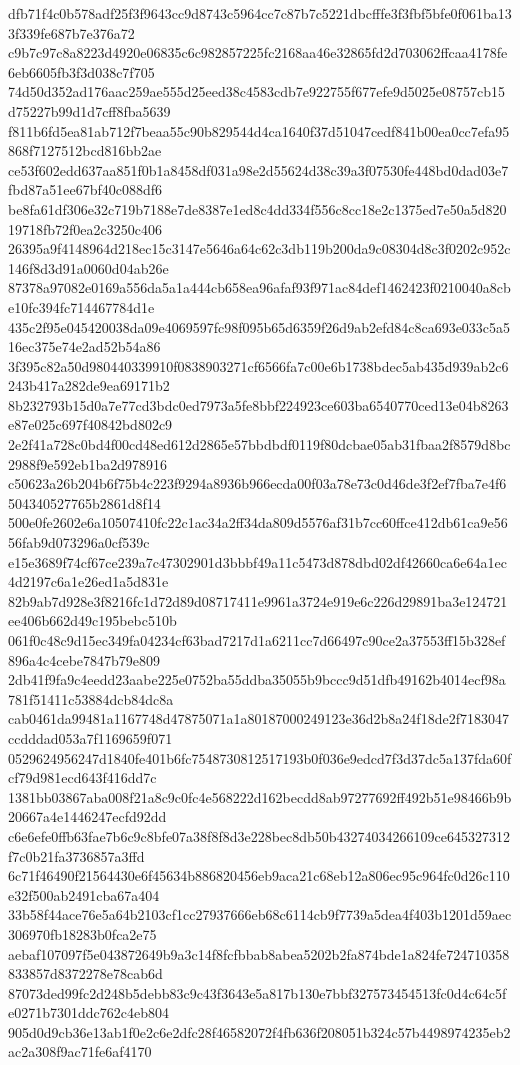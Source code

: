 {dfb71f4c0b578adf25f3f9643cc9d8743c5964cc7c87b7c5221dbcfffe3f3fbf5bfe0f061ba133f339fe687b7e376a72
c9b7c97c8a8223d4920e06835c6c982857225fc2168aa46e32865fd2d703062ffcaa4178fe6eb6605fb3f3d038c7f705
74d50d352ad176aac259ae555d25eed38c4583cdb7e922755f677efe9d5025e08757cb15d75227b99d1d7cff8fba5639
f811b6fd5ea81ab712f7beaa55c90b829544d4ca1640f37d51047cedf841b00ea0cc7efa95868f7127512bcd816bb2ae
ce53f602edd637aa851f0b1a8458df031a98e2d55624d38c39a3f07530fe448bd0dad03e7fbd87a51ee67bf40c088df6
be8fa61df306e32c719b7188e7de8387e1ed8c4dd334f556c8cc18e2c1375ed7e50a5d82019718fb72f0ea2c3250c406
26395a9f4148964d218ec15c3147e5646a64c62c3db119b200da9c08304d8c3f0202c952c146f8d3d91a0060d04ab26e
87378a97082e0169a556da5a1a444cb658ea96afaf93f971ac84def1462423f0210040a8cbe10fc394fc714467784d1e
435c2f95e045420038da09e4069597fc98f095b65d6359f26d9ab2efd84c8ca693e033c5a516ec375e74e2ad52b54a86
3f395c82a50d980440339910f0838903271cf6566fa7c00e6b1738bdec5ab435d939ab2c6243b417a282de9ea69171b2
8b232793b15d0a7e77cd3bdc0ed7973a5fe8bbf224923ce603ba6540770ced13e04b8263e87e025c697f40842bd802c9
2e2f41a728c0bd4f00cd48ed612d2865e57bbdbdf0119f80dcbae05ab31fbaa2f8579d8bc2988f9e592eb1ba2d978916
c50623a26b204b6f75b4c223f9294a8936b966ecda00f03a78e73c0d46de3f2ef7fba7e4f6504340527765b2861d8f14
500e0fe2602e6a10507410fc22c1ac34a2ff34da809d5576af31b7cc60ffce412db61ca9e5656fab9d073296a0cf539c
e15e3689f74cf67ce239a7c47302901d3bbbf49a11c5473d878dbd02df42660ca6e64a1ec4d2197c6a1e26ed1a5d831e
82b9ab7d928e3f8216fc1d72d89d08717411e9961a3724e919e6c226d29891ba3e124721ee406b662d49c195bebc510b
061f0c48c9d15ec349fa04234cf63bad7217d1a6211cc7d66497c90ce2a37553ff15b328ef896a4c4cebe7847b79e809
2db41f9fa9c4eedd23aabe225e0752ba55ddba35055b9bccc9d51dfb49162b4014ecf98a781f51411c53884dcb84dc8a
cab0461da99481a1167748d47875071a1a80187000249123e36d2b8a24f18de2f7183047ccdddad053a7f1169659f071
0529624956247d1840fe401b6fc7548730812517193b0f036e9edcd7f3d37dc5a137fda60fcf79d981ecd643f416dd7c
1381bb03867aba008f21a8c9c0fc4e568222d162becdd8ab97277692ff492b51e98466b9b20667a4e1446247ecfd92dd
c6e6efe0ffb63fae7b6c9c8bfe07a38f8f8d3e228bec8db50b43274034266109ce645327312f7c0b21fa3736857a3ffd
6c71f46490f21564430e6f45634b886820456eb9aca21c68eb12a806ec95c964fc0d26c110e32f500ab2491cba67a404
33b58f44ace76e5a64b2103cf1cc27937666eb68c6114cb9f7739a5dea4f403b1201d59aec306970fb18283b0fca2e75
aebaf107097f5e043872649b9a3c14f8fcfbbab8abea5202b2fa874bde1a824fe724710358833857d8372278e78cab6d
87073ded99fc2d248b5debb83c9c43f3643e5a817b130e7bbf327573454513fc0d4c64c5fe0271b7301ddc762c4eb804
905d0d9cb36e13ab1f0e2c6e2dfc28f46582072f4fb636f208051b324c57b4498974235eb2ac2a308f9ac71fe6af4170
}
